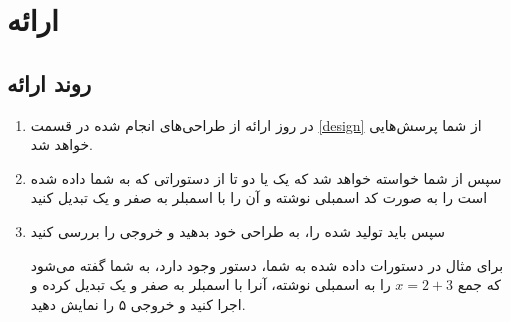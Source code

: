 \documentclass[11pt, dvipsnames, svgnames, x11names]{article}
\begin{document}
\section{ارائه}
\subsection{روند ارائه}
\begin{enumerate}
\item
در روز ارائه از طراحی‌های انجام شده در قسمت 
\ref{design}
از شما پرسش‌هایی خواهد شد.

\item 
سپس از شما خواسته خواهد شد که یک یا دو تا از دستوراتی که به شما داده شده است را به صورت کد اسمبلی نوشته و آن را با اسمبلر به صفر و یک تبدیل کنید

\item 
سپس باید  تولید شده را، به طراحی خود بدهید و خروجی را بررسی کنید

برای مثال در دستورات داده شده به شما، دستور 
وجود دارد، به شما گفته می‌شود که جمع 
$x = 2 + 3$
را به اسمبلی نوشته، آنرا با اسمبلر به صفر و یک تبدیل کرده و اجرا کنید و خروجی ۵ را نمایش دهید.
\end{enumerate}
\end{document}
